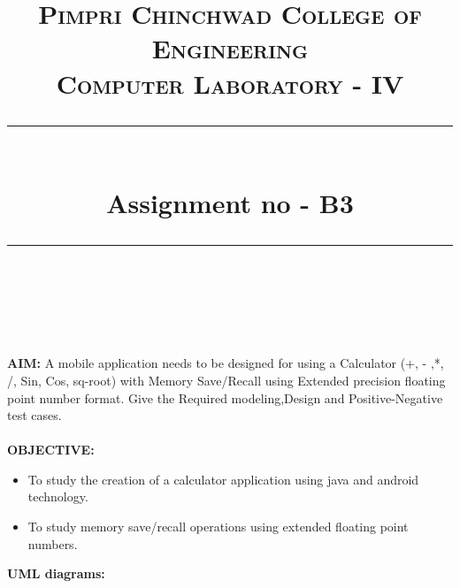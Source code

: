 \documentclass[a4paper,12pt]{article}
\title{
	\normalfont \normalsize 
	\textsc{Pimpri Chinchwad College of Engineering \\ 
		Computer Laboratory - IV} \\
	[10pt]   
	\rule{\linewidth}{0.5pt} \\[6pt] 
	\huge Assignment no - B3 \\
	\rule{\linewidth}{2pt}  \\[10pt]
}
\author{}
\date{\normalsize}
\begin{document}
	\maketitle

\textbf{AIM: } A mobile application needs to be designed for using a Calculator (+, - ,*, /, Sin, Cos, sq-root) with Memory Save/Recall using Extended precision floating point number format. Give the Required modeling,Design and Positive-Negative test cases.\\\\


\noindent \textbf{OBJECTIVE:}
\begin{itemize}
\item To study the creation of a calculator application using java and android technology.
\item To study memory save/recall operations using extended floating point numbers. 
\end{itemize}
\noindent \textbf{UML diagrams:}\\
\end{document}
